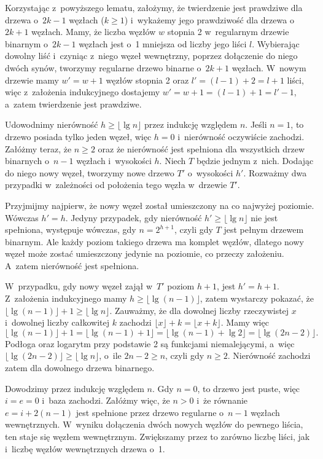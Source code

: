 Korzystając z~powyższego lematu, założymy, że twierdzenie jest prawdziwe dla drzewa o~$2k-1$ węzłach ($k\ge1$) i~wykażemy jego prawdziwość dla drzewa o~$2k+1$ węzłach.
Mamy, że liczba węzłów $w$ stopnia 2 w~regularnym drzewie binarnym o~$2k-1$ węzłach jest o~1 mniejsza od liczby jego liści $l$.
Wybierając dowolny liść i~czyniąc z~niego węzeł wewnętrzny, poprzez dołączenie do niego dwóch synów, tworzymy regularne drzewo binarne o~$2k+1$ węzłach.
W~nowym drzewie mamy $w'=w+1$ węzłów stopnia 2 oraz $l'=(l-1)+2=l+1$ liści, więc z~założenia indukcyjnego dostajemy $w'=w+1=(l-1)+1=l'-1$, a~zatem twierdzenie jest prawdziwe.

\exercise %
Udowodnimy nierówność $h\ge\lfloor\lg n\rfloor$ przez indukcję względem $n$.
Jeśli $n=1$, to drzewo posiada tylko jeden węzeł, więc $h=0$ i~nierówność oczywiście zachodzi.
Załóżmy teraz, że $n\ge2$ oraz że nierówność jest spełniona dla wszystkich drzew binarnych o~$n-1$ węzłach i~wysokości $h$.
Niech $T$ będzie jednym z~nich.
Dodając do niego nowy węzeł, tworzymy nowe drzewo $T'$ o~wysokości $h'$.
Rozważmy dwa przypadki w~zależności od położenia tego węzła w~drzewie $T'$.

Przyjmijmy najpierw, że nowy węzeł został umieszczony na co najwyżej  poziomie.
Wówczas $h'=h$.
Jedyny przypadek, gdy nierówność $h'\ge\lfloor\lg n\rfloor$ nie jest spełniona, występuje wówczas, gdy $n=2^{h+1}$, czyli gdy $T$ jest pełnym drzewem binarnym.
Ale każdy poziom takiego drzewa ma komplet węzłów, dlatego nowy węzeł może zostać umieszczony jedynie na  poziomie, co przeczy założeniu.
A~zatem nierówność jest spełniona.

W~przypadku, gdy nowy węzeł zajął w~$T'$ poziom $h+1$, jest $h'=h+1$.
Z~założenia indukcyjnego mamy $h\ge\lfloor\lg(n-1)\rfloor$, zatem wystarczy pokazać, że $\lfloor\lg(n-1)\rfloor+1\ge\lfloor\lg n\rfloor$.
Zauważmy, że dla dowolnej liczby rzeczywistej $x$ i~dowolnej liczby całkowitej $k$ zachodzi $\lfloor x\rfloor+k=\lfloor x+k\rfloor$.
Mamy więc
\[
    \lfloor\lg(n-1)\rfloor+1 = \lfloor\lg(n-1)+1\rfloor = \lfloor\lg(n-1)+\lg2\rfloor = \lfloor\lg(2n-2)\rfloor.
\]
Podłoga oraz logarytm przy podstawie 2 są funkcjami niemalejącymi, a~więc $\lfloor\lg(2n-2)\rfloor\ge\lfloor\lg n\rfloor$, o~ile $2n-2\ge n$, czyli gdy $n\ge2$.
Nierówność zachodzi zatem dla dowolnego drzewa binarnego.

\exercise %
Dowodzimy przez indukcję względem $n$.
Gdy $n=0$, to drzewo jest puste, więc $i=e=0$ i~baza zachodzi.
Załóżmy więc, że $n>0$ i~że równanie $e=i+2(n-1)$ jest spełnione przez drzewo regularne o~$n-1$ węzłach wewnętrznych.
W~wyniku dołączenia dwóch nowych węzłów do pewnego liścia, ten staje się węzłem wewnętrznym.
Zwiększamy przez to zarówno liczbę liści, jak i~liczbę węzłów wewnętrznych drzewa o~1.

